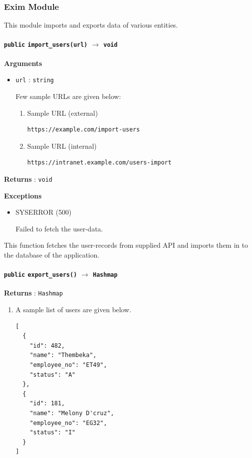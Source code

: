 \documentclass{article}%
\begin{document}
\subsubsection{Exim Module}%

%
This module imports and exports data of various entities.%
\hypertarget{ID:1375483315}{}%
\paragraph{\xspace \texttt{public} \texttt{import\_users(url)} $\to$ \texttt{void}}%

%
\small%
\textbf{Arguments}%
\normalsize%
\begin{itemize}%
\item%
\verb|url|%
: %
\verb|string|%
\par%
Few sample URLs are given below:%
\begin{enumerate}%
\item%
\hypertarget{ID:92983384}{}%
Sample URL (external)%
\begin{verbatim}https://example.com/import-users\end{verbatim}%
\item%
\hypertarget{ID:423601549}{}%
Sample URL (internal)%
\begin{verbatim}https://intranet.example.com/users-import\end{verbatim}%
\end{enumerate}%
\end{itemize}%
\small%
\textbf{Returns}%
\normalsize%
: %
\verb|void|%
\par%
\small%
\textbf{Exceptions}%
\normalsize%
\begin{itemize}%
\item%
SYSERROR (500)%
\par%
Failed to fetch the user{-}data.%
\end{itemize}%
\par%
This function fetches the user{-}records from supplied API and imports them in to the database of the application.%
\hypertarget{ID:241763498}{}%
\paragraph{\xspace \texttt{public} \texttt{export\_users()} $\to$ \texttt{Hashmap}}%

%
\small%
\textbf{Returns}%
\normalsize%
: %
\verb|Hashmap|%
\begin{enumerate}%
\item%
\hypertarget{ID:1020430619}{}%
A sample list of users are given below.%
\begin{verbatim}[
  {
    "id": 482,
    "name": "Thembeka",
    "employee_no": "ET49",
    "status": "A"
  },
  {
    "id": 181,
    "name": "Melony D'cruz",
    "employee_no": "EG32",
    "status": "I"
  }
]\end{verbatim}%
\end{enumerate}%
\hypertarget{ID:1722806927}{}%
\end{document}
